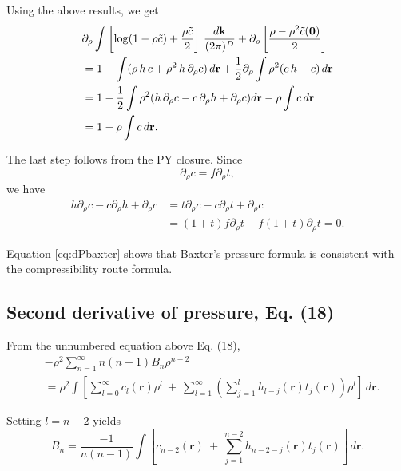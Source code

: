 \documentclass[aip,jcp,reprint,superscriptaddress]{revtex4-1}
\numberwithin{equation}{subsection}
\newcommand{\vct}[1]{\mathbf{#1}}
\providecommand{\vr}{} %
\renewcommand{\vr}{\vct{r}}
\newcommand{\vk}{\vct{k}}
\newcommand{\dvk}{\frac{d\vk}{(2\pi)^D}}
\begin{document}
Using the above results, we get
\begin{align}
  &  \partial_\rho \int \left[
    \log(1-\rho\tilde{c}) + \frac{ \rho \tilde{c} }{2}
  \right] \, \dvk
  +\partial_\rho \left[
    \frac{\rho - \rho^2 \tilde{c}(\vct{0}) } {2}
  \right] \notag \\
  &= 1 -\int ( \rho \, h \, c + \rho^2 \, h \, \partial_\rho c ) \, d\vr
  + \frac{1}{2} \partial_\rho \int \rho^2 (c \, h - c) \, d\vr \notag \\
  &= 1
  - \frac{1}{2} \int \rho^2 (h \, \partial_\rho c - c \, \partial_\rho h + \partial_\rho c) d\vr
  - \rho \int c \, d\vr \notag \\
  &= 1
  - \rho \int c \, d\vr.
  \label{eq:dPbaxter}
\end{align}

The last step follows from the PY closure.
Since
\[
  \partial_\rho c = f\partial_\rho t,
\]
we have
\begin{align*}
  h \partial_\rho c - c \partial_\rho h + \partial_\rho c
&= t \partial_\rho c - c \partial_\rho t + \partial_\rho c \\
&= (1 + t) f \partial_\rho t - f (1 + t) \partial_\rho t = 0.
\end{align*}

Equation \eqref{eq:dPbaxter} shows that Baxter's pressure
formula is consistent with the compressibility route formula.



\subsection{Second derivative of pressure, Eq. (18)}

From the unnumbered equation above Eq. (18),
\begin{align*}
&  -\rho^2 \sum_{n = 1}^\infty
  n (n - 1) B_n \rho^{n - 2} \\
&=
  \rho^2 \int \left[
    \sum_{l = 0}^\infty c_l(\vr) \rho^l  \
    + \
    \sum_{l = 1}^\infty
      \left( \sum_{j=1}^{l} h_{l-j}(\vr) t_j(\vr) \right) \rho^l
  \right] \, d\vr.
\end{align*}

Setting $l = n - 2$ yields
\[
  B_n
=
  \frac{-1}{n(n-1)}
   \int \left[
     c_{n-2}(\vr) \
    + \
      \sum_{j=1}^{n-2} h_{n-2-j}(\vr) t_j(\vr)
  \right] \, d\vr.
\]
\end{document}
